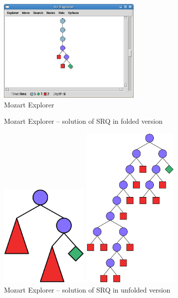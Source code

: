 \begin{figure}
\caption{\label{mozart-explorer-screenshot}Mozart Explorer}
\begin{center}
\includegraphics[height=5cm]{images/screenshoty/explorer.eps}
\end{center}
\end{figure}

\begin{figure}[b]
\begin{minipage}[t]{5.0cm}
\caption{\label{srq-mozart-folded}Mozart Explorer -- solution of SRQ in folded version}
\includegraphics[height=5cm]{images/mozart/srq.oz.color.folded.eps}
\end{minipage}
\hfill
\begin{minipage}[t]{6.0cm}
\caption{\label{srq-mozart-unfolded}Mozart Explorer -- solution of SRQ in unfolded version}
\includegraphics[height=8cm]{images/mozart/srq.oz.color.unfolded.eps}
\end{minipage}
\end{figure}



